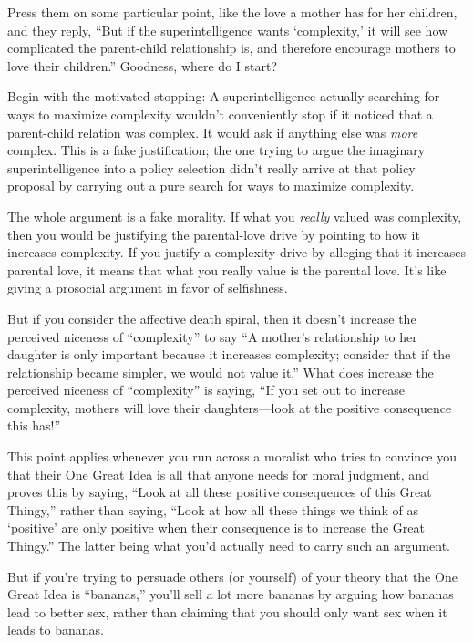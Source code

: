  Press them on some particular point, like the love a mother has
for her children, and they reply, ``But if the
superintelligence wants `complexity,' it
will see how complicated the parent-child relationship is, and
therefore encourage mothers to love their children.''
Goodness, where do I start?


 Begin with the motivated stopping: A superintelligence actually
searching for ways to maximize complexity wouldn't
conveniently stop if it noticed that a parent-child relation was
complex. It would ask if anything else was \textit{more} complex. This
is a fake justification; the one trying to argue the imaginary
superintelligence into a policy selection didn't really
arrive at that policy proposal by carrying out a pure search for ways
to maximize complexity.


 The whole argument is a fake morality. If what you \textit{really}
valued was complexity, then you would be justifying the parental-love
drive by pointing to how it increases complexity. If you justify a
complexity drive by alleging that it increases parental love, it means
that what you really value is the parental love. It's
like giving a prosocial argument in favor of selfishness.


 But if you consider the affective death spiral, then it
doesn't increase the perceived niceness of
``complexity'' to say
``A mother's relationship to her
daughter is only important because it increases complexity; consider
that if the relationship became simpler, we would not value
it.'' What does increase the perceived niceness of
``complexity'' is saying,
``If you set out to increase complexity, mothers will
love their daughters---look at the positive consequence this
has!''


 This point applies whenever you run across a moralist who tries to
convince you that their One Great Idea is all that anyone needs for
moral judgment, and proves this by saying, ``Look at
all these positive consequences of this Great
Thingy,'' rather than saying, ``Look
at how all these things we think of as
`positive' are only positive when their
consequence is to increase the Great Thingy.'' The
latter being what you'd actually need to carry such an
argument.


 But if you're trying to persuade others (or
yourself) of your theory that the One Great Idea is
``bananas,'' you'll
sell a lot more bananas by arguing how bananas lead to better sex,
rather than claiming that you should only want sex when it leads to
bananas.


